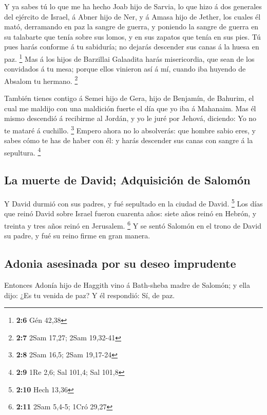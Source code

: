  Y ya sabes tú lo que me ha hecho Joab hijo de Sarvia, lo
que hizo á dos generales del ejército de Israel, á Abner hijo de Ner, y
á Amasa hijo de Jether, los cuales él mató, derramando en paz la sangre
de guerra, y poniendo la sangre de guerra en su talabarte que tenía
sobre sus lomos, y en sus zapatos que tenía en sus pies. 
Tú pues harás conforme á tu sabiduría; no dejarás descender sus canas á
la huesa en paz. \footnote{\textbf{2:6} Gén 42,38}  Mas á
los hijos de Barzillai Galaadita harás misericordia, que sean de los
convidados á tu mesa; porque ellos vinieron así á mí, cuando iba huyendo
de Absalom tu hermano. \footnote{\textbf{2:7} 2Sam 17,27; 2Sam 19,32-41}

 También tienes contigo á Semei hijo de Gera, hijo de
Benjamín, de Bahurim, el cual me maldijo con una maldición fuerte el día
que yo iba á Mahanaim. Mas él mismo descendió á recibirme al Jordán, y
yo le juré por Jehová, diciendo: Yo no te mataré á cuchillo. \footnote{\textbf{2:8}
  2Sam 16,5; 2Sam 19,17-24}  Empero ahora no lo
absolverás: que hombre sabio eres, y sabes cómo te has de haber con él:
y harás descender sus canas con sangre á la sepultura. \footnote{\textbf{2:9}
  1Re 2,6; Sal 101,4; Sal 101,8}

\hypertarget{la-muerte-de-david-adquisiciuxf3n-de-salomuxf3n}{%
\subsection{La muerte de David; Adquisición de
Salomón}\label{la-muerte-de-david-adquisiciuxf3n-de-salomuxf3n}}

 Y David durmió con sus padres, y fué sepultado en la
ciudad de David. \footnote{\textbf{2:10} Hech 13,36}  Los
días que reinó David sobre Israel fueron cuarenta años: siete años reinó
en Hebrón, y treinta y tres años reinó en Jerusalem. \footnote{\textbf{2:11}
  2Sam 5,4-5; 1Cró 29,27}  Y se sentó Salomón en el trono
de David su padre, y fué su reino firme en gran manera.

\hypertarget{adonia-asesinada-por-su-deseo-imprudente}{%
\subsection{Adonia asesinada por su deseo
imprudente}\label{adonia-asesinada-por-su-deseo-imprudente}}

 Entonces Adonía hijo de Haggith vino á Bath-sheba madre
de Salomón; y ella dijo: ¿Es tu venida de paz? Y él respondió: Sí, de
paz.

